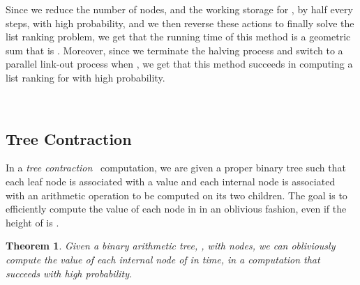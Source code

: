 \documentclass[11pt]{article}
\newenvironment{proof}{\begin{normalsize}\noindent{\bf Proof:}}{  \end{normalsize} \\}
\newcommand{\qed}{}
\newtheorem{theorem}{Theorem}
\begin{document}
{\begin{proof}
Since we reduce the number of nodes, and the working storage for , 
by half every
 steps, with high probability, and we then reverse these actions 
to finally solve the
list ranking problem, we get that the running time of this method
is a geometric sum that is .
Moreover, since we terminate the halving process and switch to a parallel
link-out process when , we get that this
method succeeds in computing a list ranking for  with high probability.
\qed
\end{proof}

\subsection{Tree Contraction}
In a
\emph{tree contraction}~\cite{adkp-sptca-89,mr-ptcia-85,rmm-lrptc-93}
computation, we are given a proper binary tree  
such that each leaf node
is associated with a value and each internal node is associated with an
arithmetic
operation to be computed on its two children.
The goal is to efficiently 
compute the value of each node in  in an oblivious fashion, 
even if the height of  is .

\begin{theorem}
\label{thm:tree}
Given a binary arithmetic tree, , with  nodes,
we can obliviously compute the value of each internal node of  in
 time, in a computation that succeeds with high probability.
\end{theorem}

}
\end{document}
